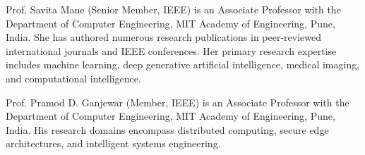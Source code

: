 \documentclass[journal]{IEEEtran}
\begin{document}
\begin{IEEEbiographynophoto}{Prof. Savita Mane}
(Senior Member, IEEE) is an Associate Professor with the Department of Computer Engineering, MIT Academy of Engineering, Pune, India. She has authored numerous research publications in peer-reviewed international journals and IEEE conferences. Her primary research expertise includes machine learning, deep generative artificial intelligence, medical imaging, and computational intelligence.
\end{IEEEbiographynophoto}

\begin{IEEEbiographynophoto}{Prof. Pramod D. Ganjewar}
(Member, IEEE) is an Associate Professor with the Department of Computer Engineering, MIT Academy of Engineering, Pune, India. His research domains encompass distributed computing, secure edge architectures, and intelligent systems engineering.
\end{IEEEbiographynophoto}
\end{document}
